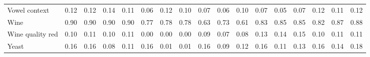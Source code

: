 \documentclass[preprint,12pt]{elsarticle}
\begin{document}
\begin{landscape}
\begin{table}[h!]
{\begin{tabular}{l c ccc ccc ccc ccc ccc}
Vowel context & 0.12 & 0.12 & 0.14 & 0.11 & 0.06 & 0.12 & 0.10 & 0.07 & 0.06 & 0.10 & 0.07 & 0.05 & 0.07 & 0.12 & 0.11 & 0.12 \\
Wine & 0.90 & 0.90 & 0.90 & 0.90 & 0.77 & 0.78 & 0.78 & 0.63 & 0.73 & 0.61 & 0.83 & 0.85 & 0.85 & 0.82 & 0.87 & 0.88 \\
Wine quality red & 0.10 & 0.11 & 0.10 & 0.11 & 0.00 & 0.00 & 0.00 & 0.09 & 0.07 & 0.08 & 0.13 & 0.14 & 0.15 & 0.10 & 0.11 & 0.11 \\
Yeast & 0.16 & 0.16 & 0.08 & 0.11 & 0.16 & 0.01 & 0.01 & 0.16 & 0.09 & 0.12 & 0.16 & 0.11 & 0.13 & 0.16 & 0.14 & 0.18 \\
\bottomrule
\end{tabular}
}
\end{table}
\end{landscape}
\end{document}
